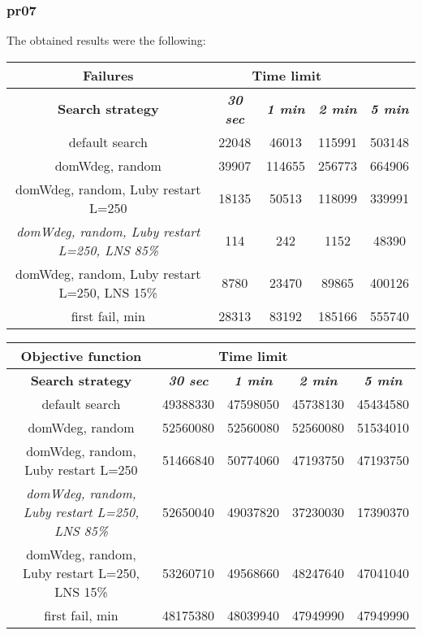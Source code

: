 \subsubsection{pr07}
The obtained results were the following:
{
\renewcommand{\arraystretch}{2}
\begin{longtable}[h]{| c | c | c | c | c |}
    \hline
    \textbf{Failures} & \multicolumn{3}{c}{Time limit} & \\
    \hline
    \textbf{Search strategy} & \textbf{\textit{30 sec}} & \textbf{\textit{1 min}} & \textbf{\textit{2 min}} & \textbf{\textit{5 min}} \\
    \hline
    \endhead
    default search                                         & 22048 &  46013 & 115991 & 503148 \\
    \hline
    domWdeg, random                                        & 39907 & 114655 & 256773 & 664906 \\
    \hline
    domWdeg, random, Luby restart L=250                    & 18135 &  50513 & 118099 & 339991 \\
    \hline
    \textit{domWdeg, random, Luby restart L=250, LNS 85\%} &   114 &    242 &   1152 &  48390 \\
    \hline
    domWdeg, random, Luby restart L=250, LNS 15\%          &  8780 &  23470 &  89865 & 400126 \\
    \hline
    first fail, min                                        & 28313 &  83192 & 185166 & 555740 \\
    \hline
\end{longtable}
}

{
\renewcommand{\arraystretch}{2}
\begin{longtable}[h]{| c | c | c | c | c |}
    \hline
    \textbf{Objective function} & \multicolumn{3}{c}{Time limit} & \\
    \hline
    \textbf{Search strategy} & \textbf{\textit{30 sec}} & \textbf{\textit{1 min}} & \textbf{\textit{2 min}} & \textbf{\textit{5 min}} \\
    \hline
    \endhead
    default search                                         & 49388330 & 47598050 & 45738130 & 45434580 \\
    \hline
    domWdeg, random                                        & 52560080 & 52560080 & 52560080 & 51534010 \\
    \hline
    domWdeg, random, Luby restart L=250                    & 51466840 & 50774060 & 47193750 & 47193750 \\
    \hline
    \textit{domWdeg, random, Luby restart L=250, LNS 85\%} & 52650040 & 49037820 & 37230030 & 17390370 \\
    \hline
    domWdeg, random, Luby restart L=250, LNS 15\%          & 53260710 & 49568660 & 48247640 & 47041040 \\
    \hline
    first fail, min                                        & 48175380 & 48039940 & 47949990 & 47949990 \\
    \hline
\end{longtable}
}